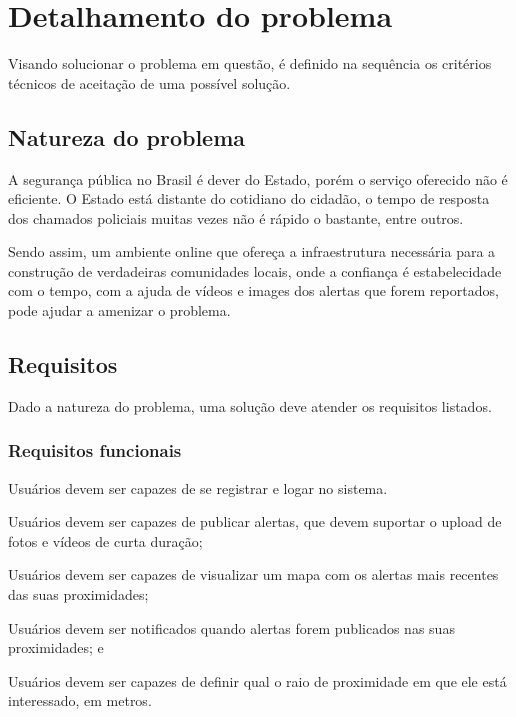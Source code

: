 \chapter{Detalhamento do problema}
\label{c.detalhamento-do-problema}


Visando solucionar o problema em questão, é definido na sequência os critérios técnicos de aceitação de uma possível solução.

\section{Natureza do problema}


A segurança pública no Brasil é dever do Estado, porém o serviço oferecido não é eficiente. O Estado está distante do cotidiano do cidadão, o tempo de resposta dos chamados policiais muitas vezes não é rápido o bastante, entre outros.

Sendo assim, um ambiente online que ofereça a infraestrutura necessária para a construção de verdadeiras comunidades locais, onde a confiança é estabelecidade com o tempo, com a ajuda de vídeos e images dos alertas que forem reportados, pode ajudar a amenizar o problema.

\section{Requisitos}
\label{s.requisitos}

Dado a natureza do problema, uma solução deve atender os requisitos listados.

\subsection{Requisitos funcionais}

\begin{alineas}
	\item Usuários devem ser capazes de se registrar e logar no sistema.
	\item Usuários devem ser capazes de publicar alertas, que devem suportar o upload de fotos e vídeos de curta duração;
 	\item Usuários devem ser capazes de visualizar um mapa com os alertas mais recentes das suas proximidades;
	\item Usuários devem ser notificados quando alertas forem publicados nas suas proximidades; e
	\item Usuários devem ser capazes de definir qual o raio de proximidade em que ele está interessado, em metros.
\end{alineas}

